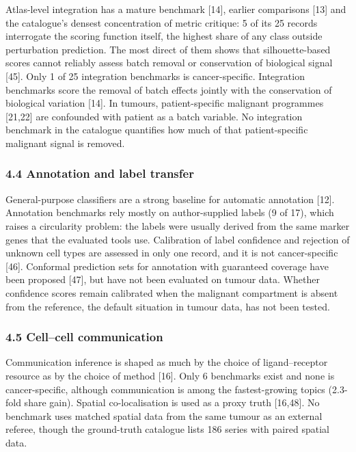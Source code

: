 \documentclass[11pt]{article}
\begin{document}
Atlas-level integration has a mature benchmark {[}14{]}, earlier
comparisons {[}13{]} and the catalogue's densest concentration of metric
critique: 5 of its 25 records interrogate the scoring function itself,
the highest share of any class outside perturbation prediction. The most
direct of them shows that silhouette-based scores cannot reliably assess
batch removal or conservation of biological signal {[}45{]}. Only 1 of
25 integration benchmarks is cancer-specific. Integration benchmarks
score the removal of batch effects jointly with the conservation of
biological variation {[}14{]}. In tumours, patient-specific malignant
programmes {[}21,22{]} are confounded with patient as a batch variable.
No integration benchmark in the catalogue quantifies how much of that
patient-specific malignant signal is removed.

\subsubsection{4.4 Annotation and label
transfer}\label{annotation-and-label-transfer}

General-purpose classifiers are a strong baseline for automatic
annotation {[}12{]}. Annotation benchmarks rely mostly on
author-supplied labels (9 of 17), which raises a circularity problem:
the labels were usually derived from the same marker genes that the
evaluated tools use. Calibration of label confidence and rejection of
unknown cell types are assessed in only one record, and it is not
cancer-specific {[}46{]}. Conformal prediction sets for annotation with
guaranteed coverage have been proposed {[}47{]}, but have not been
evaluated on tumour data. Whether confidence scores remain calibrated
when the malignant compartment is absent from the reference, the default
situation in tumour data, has not been tested.

\subsubsection{4.5 Cell--cell
communication}\label{cellcell-communication}

Communication inference is shaped as much by the choice of
ligand--receptor resource as by the choice of method {[}16{]}. Only 6
benchmarks exist and none is cancer-specific, although communication is
among the fastest-growing topics (2.3-fold share gain). Spatial
co-localisation is used as a proxy truth {[}16,48{]}. No benchmark uses
matched spatial data from the same tumour as an external referee, though
the ground-truth catalogue lists 186 series with paired spatial data.
\end{document}
